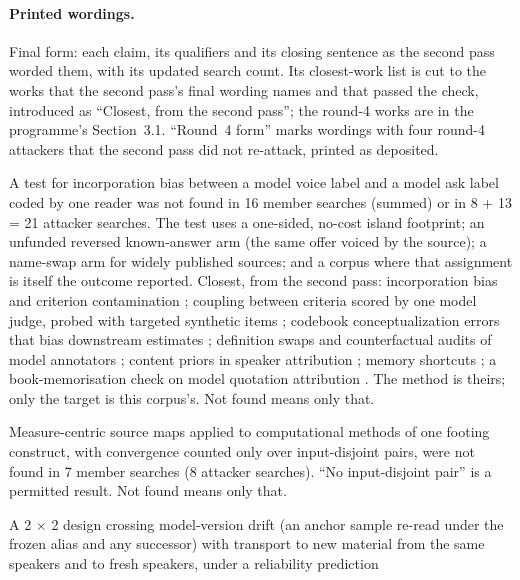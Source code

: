 \paragraph{Printed wordings.} Final form: each claim, its qualifiers and its closing sentence as the second pass worded
them, with its updated search count. Its closest-work list is cut to the works that the second pass's final wording
names and that passed the check, introduced as ``Closest, from the second pass''; the round-4 works are in the
programme's Section~3.1. ``Round~4 form'' marks wordings with
four round-4 attackers that the second pass did not re-attack, printed as deposited.

{\footnotesize
\begin{description}
\setlength{\itemsep}{1pt}
\item[N04.] A test for incorporation bias between a model voice label and a model ask label coded by one reader was
not found in 16 member searches (summed) or in 8 + 13 = 21 attacker searches. The test uses a one-sided, no-cost
island footprint; an unfunded reversed known-answer arm (the same offer voiced by the source); a name-swap arm for
widely published sources; and a corpus where that assignment is itself the outcome reported. Closest, from the
second pass: incorporation bias and criterion contamination
\cite{schroeder1984influence,lemery2002revealing,budescu1981corrections}; coupling between criteria scored by
one model judge, probed with targeted synthetic items \cite{p12singh2026radar,p12hu2024llm}; codebook
conceptualization errors that bias downstream estimates \cite{p12halterman2025protest}; definition swaps and
counterfactual audits of model annotators \cite{mishra2026definitions,p12he2026better}; content priors in speaker
attribution \cite{p12lee2026hear,p12liu2026voice}; memory shortcuts \cite{p12wang2026text}; a book-memorisation check
on model quotation attribution \cite{p12michel2025evaluating}. The method is theirs; only the target is this corpus's.
Not found means only that.
\item[N05 (round~4 form).] Measure-centric source maps applied to computational methods of one footing construct, with
convergence counted only over input-disjoint pairs, were not found in 7 member searches (8 attacker searches). ``No
input-disjoint pair'' is a permitted result. Not found means only that.
\item[N06.] A 2 $\times$ 2 design crossing model-version drift (an anchor sample re-read under the frozen alias and any
successor) with transport to new material from the same speakers and to fresh speakers, under a reliability prediction

\end{description}}
